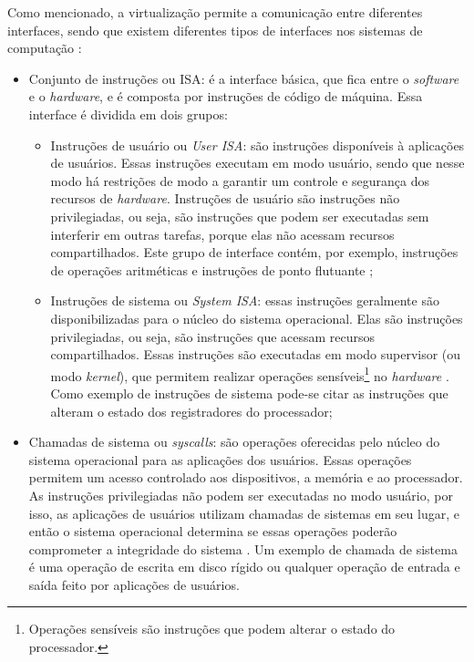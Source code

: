 Como mencionado, a virtualização permite a comunicação entre diferentes interfaces, sendo que existem diferentes tipos de interfaces
nos sistemas de computação \cite{maziero2013}:
\begin{itemize}
 \item Conjunto de instruções ou \ac{ISA}: é a interface básica, que fica entre o \textit{software} e o \textit{hardware}, e é composta por 
 instruções de código de máquina. Essa interface é dividida em dois grupos:
 \begin{itemize}
  \item Instruções de usuário ou \textit{User \ac{ISA}}: são instruções disponíveis à aplicações de usuários. Essas instruções executam em 
  modo usuário, sendo que nesse modo há restrições de modo a garantir um controle e segurança dos recursos de \textit{hardware}. Instruções de 
  usuário são instruções não privilegiadas, ou seja, são instruções que podem ser executadas sem interferir em outras tarefas, porque elas não 
  acessam recursos compartilhados. Este grupo de interface contém, por exemplo, instruções de operações aritméticas e instruções de ponto flutuante 
  \cite{buyya2013};
  \item Instruções de sistema ou \textit{System \ac{ISA}}: essas instruções geralmente são disponibilizadas para o núcleo do sistema operacional. 
  Elas são instruções privilegiadas, ou seja, são instruções que acessam recursos compartilhados. Essas instruções são executadas em modo 
  supervisor (ou modo \textit{kernel}), que permitem realizar operações sensíveis\footnote[1]{Operações sensíveis são instruções que podem alterar o 
  estado do processador.} no \textit{hardware} \cite{buyya2013}. Como exemplo de instruções de sistema pode-se citar as instruções que alteram 
  o estado dos registradores do processador; %
 \end{itemize}
 \item Chamadas de sistema ou \textit{syscalls}: são operações oferecidas pelo núcleo do sistema operacional para as aplicações dos usuários.
 Essas operações permitem um acesso controlado aos dispositivos, a memória e ao processador. 
 As instruções privilegiadas não podem ser executadas no modo usuário, por isso, as aplicações de usuários utilizam chamadas de sistemas em seu 
 lugar, e então o sistema operacional determina se essas operações poderão comprometer a integridade do sistema \cite{marinescu2013}.
 Um exemplo de chamada de sistema é uma operação de escrita em disco rígido ou qualquer operação de entrada e saída feito por aplicações de usuários.
\end{itemize}

